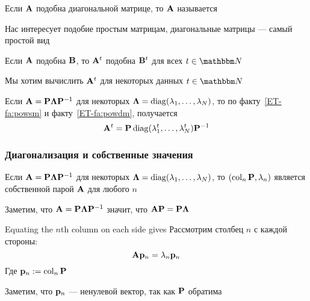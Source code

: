 \begin{frame}
   
    \vspace{2em}
    Если $\mathbf A$ подобна диагональной матрице, то $\mathbf A$ 
    называется 
    
    \vspace{.7em}
    Нас интересует подобие простым матрицам, диагональные матрицы --- самый простой вид 
    
\end{frame}

\begin{frame}

     \vspace{2em}
    \Fact{\eqref{ET-fa:powsm}}
        Если $\mathbf A$ подобна $\mathbf B$, то $\mathbf A^t$ подобна
        $\mathbf B^t$ для всех $t \in \NN$
    
    \vspace{.7em}
    \Eg
    Мы хотим вычислить $\mathbf A^t$ для некоторых данных $t \in \NN$ 
    
    Если $\mathbf A = \mathbf P {\boldsymbol \Lambda} \mathbf P^{-1}$ для некоторых
    ${\boldsymbol \Lambda} = \operatorname{diag}(\lambda_1, \ldots, \lambda_N)$, то по 
    факту~\ref{ET-fa:powsm} и факту~\ref{ET-fa:powdm}, получается
        $$\mathbf A^t = \mathbf P \operatorname{diag}(\lambda_1^t, \ldots, \lambda_N^t)
        \mathbf P^{-1}$$
    
\end{frame}

\begin{frame}\frametitle{Диагонализация и собственные значения}

    \vspace{.7em}
    \Fact{\eqref{ET-fa:diagee}}
    Если $\mathbf A = \mathbf P {\boldsymbol \Lambda} \mathbf P^{-1}$ для некоторых ${\boldsymbol \Lambda} =
        \operatorname{diag}(\lambda_1, \ldots, \lambda_N)$, то $(\operatorname{col}_n \mathbf P,
            \lambda_n)$ является собственной парой $\mathbf A$ для любого $n$
            
    \vspace{.7em}    
    
    \Prf
    Заметим, что $\mathbf A = \mathbf P {\boldsymbol \Lambda} \mathbf P^{-1}$ значит, 
    что $\mathbf A \mathbf P = \mathbf P {\boldsymbol \Lambda}$
    
    Equating the $n$th column on each side gives 
    Рассмотрим столбец $n$ с каждой стороны:
        $$\mathbf A {\mathbf p}_n = \lambda_n
        {\mathbf p}_n$$
    Где ${\mathbf p}_n := \operatorname{col}_n \mathbf P$
    
    Заметим, что ${\mathbf p}_n$ --- ненулевой вектор,
    так как $\mathbf P$ обратима
        
\end{frame}

